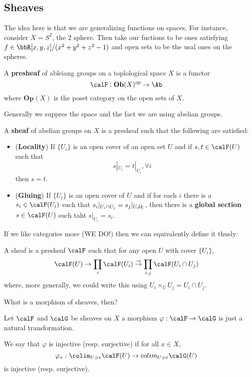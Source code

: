 \documentclass[12pt]{article}
\begin{document}
\subsection{Sheaves}
\begin{ex}
	The idea here is that we are generalizing functions on spaces. For instance, consider $X=S^2$, the 2 sphere.
	Then take our fuctions to be ones satisfying $f\in\bbR[x,y,z]/(x^2+y^2+z^2-1)$ and open sets to be the usal ones on the spheres.
\end{ex}
\begin{defn}
	A \textbf{presheaf} of ableiang groups on a toplological space $X$ is a functor 
	\[\calF:\mathbf{Ob}(X)^{op}\to \Ab\]
	where $\mathbf{Op}(X)$ is the poset category on the open sets of $X$.

	Generally we suppres the space and the fact we are using abelian groups.
\end{defn}
\begin{defn}\label{defn-sheaf}
	A \textbf{sheaf} of abelian groups on $X$ is a presheaf such that the following are satisfied:
	\begin{itemize}
		\item (\textbf{Locality}) If $\{U_i\}$ is an open cover of an open set $U$ and if $s,t\in\calF(U)$ such that 
		\[s|_{U_i}=t|_{U_i},\forall i\]
		then $s=t$.
		\item (\textbf{Gluing}) If $\{U_i\}$ is an open cover of $U$ and if for each $i$ there is a $s_i\in\calF(U_i)$
		such that $s_i|_{U_i\cap U_j}=s_j|_{U_i\cal U_j}$, then there is a \textbf{global section} $s\in \calF(U)$ such taht $s|_{U_i}=s_i$.
	\end{itemize}
\end{defn}
If we like categories more (WE DO!) then we can equivalently define it thusly:
\begin{defn}\label{defn-sheaf-2}
	A sheaf is a presheaf $\calF$ such that for any open $U$ with cover $\{U_i\}$,
	\[\calF(U)\to \prod_i\calF(U_i)\stackrel{\to}{\to}\prod_{i,j}\calF(U_i\cap U_j)\]
	where, more generally, we could write this using $U_i\times_UU_j=U_i\cap U_j.$
\end{defn}

What is a morphism of sheaves, then?
\begin{defn}
	Let $\calF$ and $\calG$ be sheaves on $X$ a morphism $\varphi:\calF\to\calG$ is just a natural transformation.
\end{defn}
\begin{rmk}
	We say that $\varphi$ is injective (resp. surjective) if for all $x\in X$, 
	\[\varphi_x:\colim_{U\ni x}\calF(U)\to colim_{U\ni x}\calG(U)\]
	is injective (resp. surjective).
\end{rmk}
\end{document}
